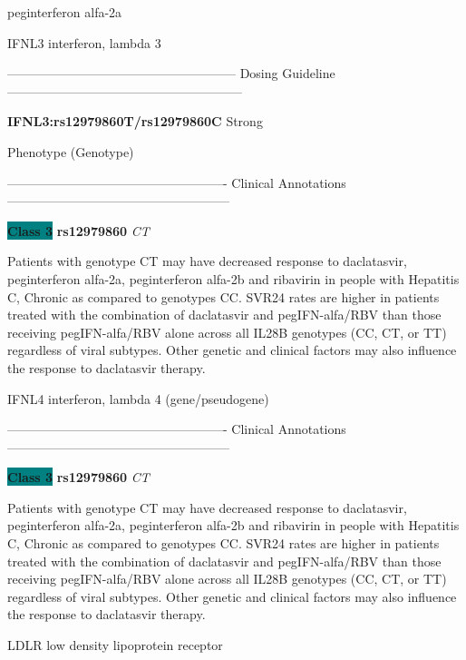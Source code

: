 \documentclass{resume} %
\begin{document}
\begin{rSection}{ peginterferon alfa-2a }
\begin{rSubsection}{ IFNL3 }{ interferon, lambda 3 }{}{}
\item[]
\item[] ------------------------------------------------------ Dosing Guideline --------------------------------------------------------\newline
\item[]
\item[] \textbf{ IFNL3:rs12979860T/rs12979860C } Strong
\item[] Phenotype (Genotype)\newline
\item[] 
\item[] ---------------------------------------------------- Clinical Annotations -----------------------------------------------------\newline
\item \textbf{\colorbox{teal} {Class 3}} \textbf{ rs12979860 } \textit{ CT }
\item[] Patients with genotype CT may have decreased response to daclatasvir, peginterferon alfa-2a, peginterferon alfa-2b and ribavirin in people with Hepatitis C, Chronic as compared to genotypes CC. SVR24 rates are higher in patients treated with the combination of daclatasvir and pegIFN-alfa/RBV than those receiving pegIFN-alfa/RBV alone across all IL28B genotypes (CC, CT, or TT) regardless of viral subtypes. Other genetic and clinical factors may also influence the response to daclatasvir therapy.
\end{rSubsection}\begin{rSubsection}{ IFNL4 }{ interferon, lambda 4 (gene/pseudogene) }{}{}
\item[]

\item[] ---------------------------------------------------- Clinical Annotations -----------------------------------------------------\newline
\item \textbf{\colorbox{teal} {Class 3}} \textbf{ rs12979860 } \textit{ CT }
\item[] Patients with genotype CT may have decreased response to daclatasvir, peginterferon alfa-2a, peginterferon alfa-2b and ribavirin in people with Hepatitis C, Chronic as compared to genotypes CC. SVR24 rates are higher in patients treated with the combination of daclatasvir and pegIFN-alfa/RBV than those receiving pegIFN-alfa/RBV alone across all IL28B genotypes (CC, CT, or TT) regardless of viral subtypes. Other genetic and clinical factors may also influence the response to daclatasvir therapy.
\end{rSubsection}\begin{rSubsection}{ LDLR }{ low density lipoprotein receptor }{}{}
\item[]


\end{rSubsection}
\end{rSection}
\end{document}
